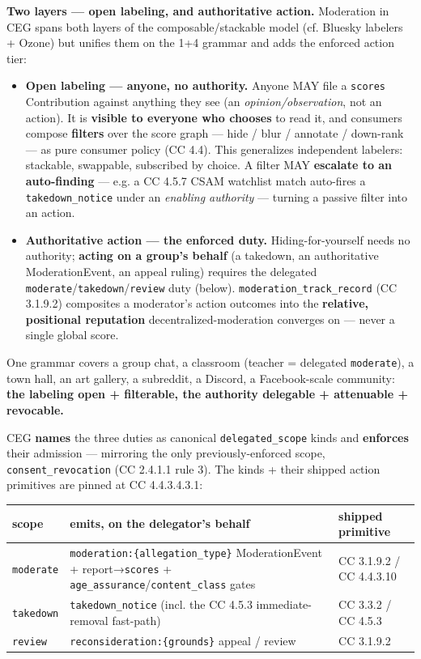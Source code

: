 \documentclass[11pt]{article}
\begin{document}
\textbf{Two layers — open labeling, and authoritative action.} Moderation in CEG spans both layers of the composable/stackable model (cf. Bluesky labelers + Ozone) but unifies them on the 1+4 grammar and adds the enforced action tier:


\begin{itemize}\setlength\itemsep{0pt}
\item \textbf{Open labeling — anyone, no authority.} Anyone MAY file a \texttt{scores} Contribution against anything they see (an \textit{opinion/observation}, not an action). It is \textbf{visible to everyone who chooses} to read it, and consumers compose \textbf{filters} over the score graph — hide / blur / annotate / down-rank — as pure consumer policy (CC 4.4). This generalizes independent labelers: stackable, swappable, subscribed by choice. A filter MAY \textbf{escalate to an auto-finding} — e.g. a CC 4.5.7 CSAM watchlist match auto-fires a \texttt{takedown\_notice} under an \textit{enabling authority} — turning a passive filter into an action.
\item \textbf{Authoritative action — the enforced duty.} Hiding-for-yourself needs no authority; \textbf{acting on a group's behalf} (a takedown, an authoritative ModerationEvent, an appeal ruling) requires the delegated \texttt{moderate}/\texttt{takedown}/\texttt{review} duty (below). \texttt{moderation\_track\_record} (CC 3.1.9.2) composites a moderator's action outcomes into the \textbf{relative, positional reputation} decentralized-moderation converges on — never a single global score.
\end{itemize}


One grammar covers a group chat, a classroom (teacher = delegated \texttt{moderate}), a town hall, an art gallery, a subreddit, a Discord, a Facebook-scale community: \textbf{the labeling open + filterable, the authority delegable + attenuable + revocable.}


CEG \textbf{names} the three duties as canonical \texttt{delegated\_scope} kinds and \textbf{enforces} their admission — mirroring the only previously-enforced scope, \texttt{consent\_revocation} (CC 2.4.1.1 rule 3). The kinds + their shipped action primitives are pinned at CC 4.4.3.4.3.1:


{\footnotesize
\begin{longtable}{|p{5.33cm}|p{5.33cm}|p{5.33cm}|}\hline
\textbf{scope} & \textbf{emits, on the delegator's behalf} & \textbf{shipped primitive} \\ \hline\endhead
\texttt{moderate} & \texttt{moderation:\{allegation\_type\}} ModerationEvent + report→\texttt{scores} + \texttt{age\_assurance}/\texttt{content\_class} gates & CC 3.1.9.2 / CC 4.4.3.10 \\ \hline
\texttt{takedown} & \texttt{takedown\_notice} (incl. the CC 4.5.3 immediate-removal fast-path) & CC 3.3.2 / CC 4.5.3 \\ \hline
\texttt{review} & \texttt{reconsideration:\{grounds\}} appeal / review & CC 3.1.9.2 \\ \hline
\end{longtable}}
\end{document}
